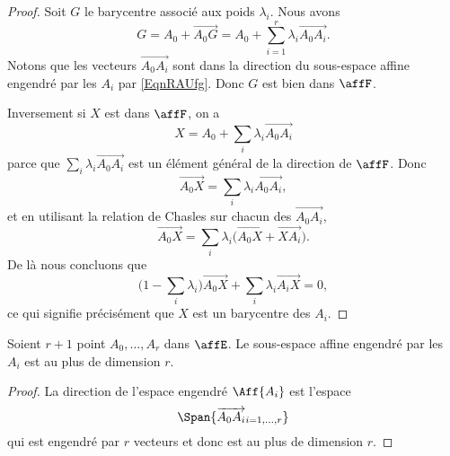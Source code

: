 \begin{proof}
	Soit \( G\) le barycentre associé aux poids \( \lambda_i\). Nous avons
	\begin{equation}
		G=A_0+\overrightarrow{ A_0G }=A_0+\sum_{i=1}^r\lambda_i\overrightarrow{ A_0A_i }.
	\end{equation}
	Notons que les vecteurs \( \overrightarrow{ A_0A_i }\) sont dans la direction du sous-espace affine engendré par les \( A_i\) par \eqref{EqnRAUfg}. Donc \( G\) est bien dans \( \affF\).

	Inversement si \( X\) est dans \( \affF\), on a
	\begin{equation}
		X=A_0+\sum_i\lambda_i\overrightarrow{ A_0A_i }
	\end{equation}
	parce que \( \sum_i\lambda_i\overrightarrow{ A_0A_i }\) est un élément général de la direction de \( \affF\). Donc
	\begin{equation}
		\overrightarrow{ A_0X }=\sum_i\lambda_i\overrightarrow{ A_0A_i },
	\end{equation}
	et en utilisant la relation de Chasles sur chacun des \( \overrightarrow{ A_0A_i }\),
	\begin{equation}
		\overrightarrow{ A_0X }=\sum_i\lambda_i\big( \overrightarrow{ A_0X }+\overrightarrow{ XA_i } \big).
	\end{equation}
	De là nous concluons que
	\begin{equation}
		\big( 1-\sum_i\lambda_i \big)\overrightarrow{ A_0X }+\sum_i\lambda_i\overrightarrow{ A_iX }=0,
	\end{equation}
	ce qui signifie précisément que \( X\) est un barycentre des \( A_i\).
\end{proof}

\begin{proposition}
	Soient \( r+1\) point \( A_0,\ldots, A_r\) dans \( \affE\). Le sous-espace affine engendré par les \( A_i\) est au plus de dimension \( r\).
\end{proposition}

\begin{proof}
	La direction de l'espace engendré \( \Aff\{ A_i \}\) est l'espace
	\begin{equation}
		\Span\{ \overrightarrow{ A_0A_i }_{i=1,\ldots, r} \}
	\end{equation}
	qui est engendré par \( r\) vecteurs et donc est au plus de dimension \( r\).
\end{proof}

